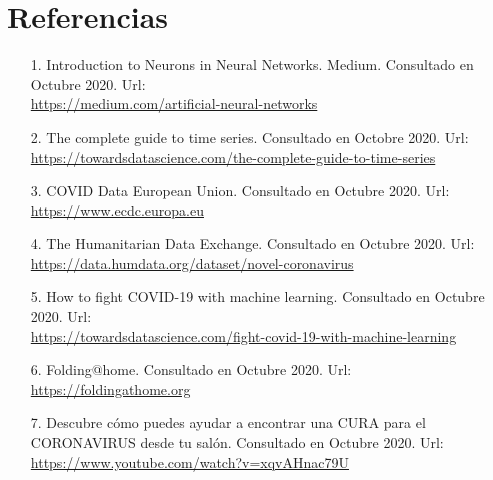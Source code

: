 \documentclass[12pt,a4paper, xcolor=table]{article}
\begin{document}
\section{Referencias}
    \begin{itemize}
        \item [1.] Introduction to Neurons in Neural Networks. Medium. Consultado en Octubre 2020. Url: \\
        \href{https://medium.com/artificial-neural-networks/introduction-to-neurons-in-neural-networks-71828d040a65}{https://medium.com/artificial-neural-networks}
        \item [2.] The complete guide to time series. Consultado en Octobre 2020. Url: \\
        \href{https://towardsdatascience.com/the-complete-guide-to-time-series-analysis-and-forecasting-70d476bfe775}{https://towardsdatascience.com/the-complete-guide-to-time-series}
        \item [3.] COVID Data European Union. Consultado en Octubre 2020. Url: \\
        \href{https://www.ecdc.europa.eu/en/geographical-distribution-2019-ncov-cases}{https://www.ecdc.europa.eu}
        \item [4.] The Humanitarian Data Exchange. Consultado en Octubre 2020. Url: \\
        \href{https://data.humdata.org/dataset/novel-coronavirus-2019-ncov-cases}{https://data.humdata.org/dataset/novel-coronavirus}
        \item [5.] How to fight COVID-19 with machine learning. Consultado en Octubre 2020. Url: \\
        \href{https://towardsdatascience.com/fight-covid-19-with-machine-learning-1d1106192d84}{https://towardsdatascience.com/fight-covid-19-with-machine-learning}
        \item [6.] Folding@home. Consultado en Octubre 2020. Url: \\
        \href{https://foldingathome.org}{https://foldingathome.org}
        \item [7.] Descubre cómo puedes ayudar a encontrar una CURA para el CORONAVIRUS desde tu salón. Consultado en Octubre 2020. Url: \\
        \href{https://www.youtube.com/watch?v=xqvAHnac79U}{https://www.youtube.com/watch?v=xqvAHnac79U}
    \end{itemize}
\printindex
\end{document}

